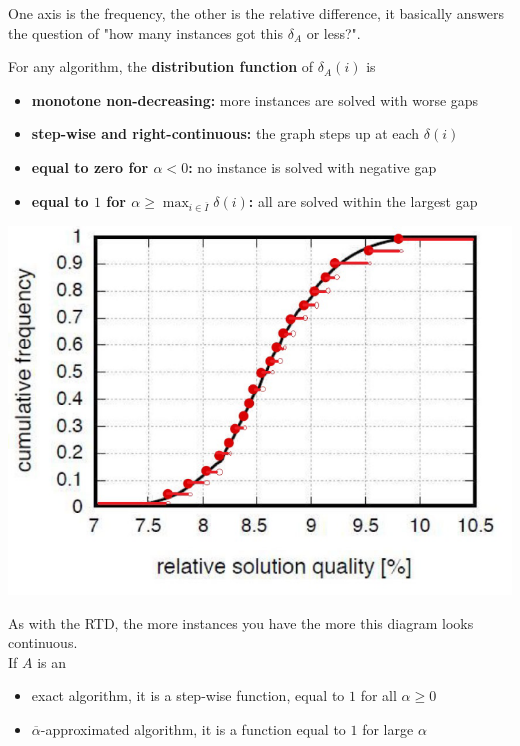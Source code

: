 One axis is the frequency, the other is the relative difference, it basically answers the question of "how many instances got this $\delta_A$ or less?". \\

\newpage

For any algorithm, the \textbf{distribution function} of $\delta_A (i)$ is
\begin{itemize}
	\item \textbf{monotone non-decreasing:} more instances are solved with worse gaps
	\item \textbf{step-wise and right-continuous:} the graph steps up at each $\delta (i)$
	\item \textbf{equal to zero for $\alpha < 0$:} no instance is solved with negative gap
	\item \textbf{equal to $1$ for $\alpha \geq \max_{i \in \overline{I}} \delta (i)$:} all are solved within the largest gap
\end{itemize}
\begin{center}
	\includegraphics[width=0.7\columnwidth]{img/SQD2}
\end{center}
As with the RTD, the more instances you have the more this diagram looks continuous.\\

If $A$ is an
\begin{itemize}
	\item exact algorithm, it is a step-wise function, equal to $1$ for all $\alpha \geq 0$
	\item $\overline{\alpha}$-approximated algorithm, it is a function equal to $1$ for large $\alpha$
\end{itemize}
\nn

